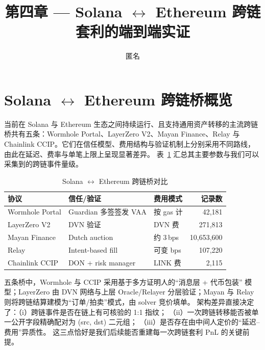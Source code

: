 \documentclass[sigconf,nonacm,10pt]{acmart}
\title{第四章 --- Solana $\leftrightarrow$ Ethereum 跨链套利的端到端实证}
\author{匿名}
\affiliation{\institution{-}\country{-}}
\begin{document}
\maketitle

\section{Solana $\leftrightarrow$ Ethereum 跨链桥概览}
\label{sec:bridges}

当前在 Solana 与 Ethereum 生态之间持续运行、且支持通用资产转移的主流跨链
桥共有五条：Wormhole Portal、LayerZero V2、Mayan Finance、Relay 与
Chainlink CCIP。它们在信任模型、费用结构与验证机制上分别采用不同路线，
由此在延迟、费率与单笔上限上呈现显著差异。
表~\ref{tab:bridges} 汇总其主要参数与我们可以采集到的跨链事件量级。

\begin{table}[h]
  \centering
  \small
  \caption{Solana $\leftrightarrow$ Ethereum 跨链桥对比}
  \label{tab:bridges}
  \begin{tabular}{lllr}
    \toprule
    \textbf{协议} & \textbf{信任/验证} & \textbf{费用模式} & \textbf{记录数} \\
    \midrule
    Wormhole Portal   & Guardian 多签签发 VAA    & 按 gas 计        & 42{,}181 \\
    LayerZero V2      & DVN 验证                 & DVN 费           & 271{,}813 \\
    Mayan Finance     & Dutch auction            & 约 3\,bps        & 10{,}653{,}600 \\
    Relay             & Intent-based fill        & 可变 bps          & 107{,}220 \\
    Chainlink CCIP    & DON + risk manager       & LINK 费          & 2{,}115 \\
    \bottomrule
  \end{tabular}
\end{table}

五条桥中，Wormhole 与 CCIP 采用基于多方证明人的“消息层 + 代币包装”
模型；LayerZero 由 DVN 网络与上层 Oracle/Relayer 分层验证；Mayan 与
Relay 则将跨链结算建模为“订单/拍卖”模式，由 solver 竞价填单。
架构差异直接决定了：（i）跨链事件是否在链上有可核验的 1:1 指纹；
（ii）一次跨链转移能否被单一公开字段精确配对为 (src, dst) 二元组；
（iii）是否存在由中间人定价的“延迟--费用”异质性。
这三点恰好是我们后续能否重建每一次跨链套利 PnL 的关键前提。
\end{document}

